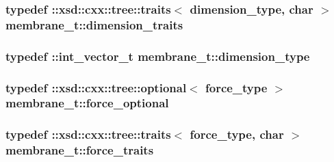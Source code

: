 \subsubsection[{\texorpdfstring{dimension\+\_\+traits}{dimension_traits}}]{\setlength{\rightskip}{0pt plus 5cm}typedef \+::xsd\+::cxx\+::tree\+::traits$<$ {\bf dimension\+\_\+type}, char $>$ {\bf membrane\+\_\+t\+::dimension\+\_\+traits}}\hypertarget{classmembrane__t_aa3e274a54801b84c5dae45b44bfe86a0}{}\label{classmembrane__t_aa3e274a54801b84c5dae45b44bfe86a0}
\subsubsection[{\texorpdfstring{dimension\+\_\+type}{dimension_type}}]{\setlength{\rightskip}{0pt plus 5cm}typedef \+::{\bf int\+\_\+vector\+\_\+t} {\bf membrane\+\_\+t\+::dimension\+\_\+type}}\hypertarget{classmembrane__t_afdd0310501689ebab285ec39821c5b76}{}\label{classmembrane__t_afdd0310501689ebab285ec39821c5b76}
\subsubsection[{\texorpdfstring{force\+\_\+optional}{force_optional}}]{\setlength{\rightskip}{0pt plus 5cm}typedef \+::xsd\+::cxx\+::tree\+::optional$<$ {\bf force\+\_\+type} $>$ {\bf membrane\+\_\+t\+::force\+\_\+optional}}\hypertarget{classmembrane__t_a558422b23faa72b3e4cbc060f9ff8ea3}{}\label{classmembrane__t_a558422b23faa72b3e4cbc060f9ff8ea3}
\subsubsection[{\texorpdfstring{force\+\_\+traits}{force_traits}}]{\setlength{\rightskip}{0pt plus 5cm}typedef \+::xsd\+::cxx\+::tree\+::traits$<$ {\bf force\+\_\+type}, char $>$ {\bf membrane\+\_\+t\+::force\+\_\+traits}}\hypertarget{classmembrane__t_a2b6b177c77d6eddf152913810d47f7f7}{}\label{classmembrane__t_a2b6b177c77d6eddf152913810d47f7f7}
